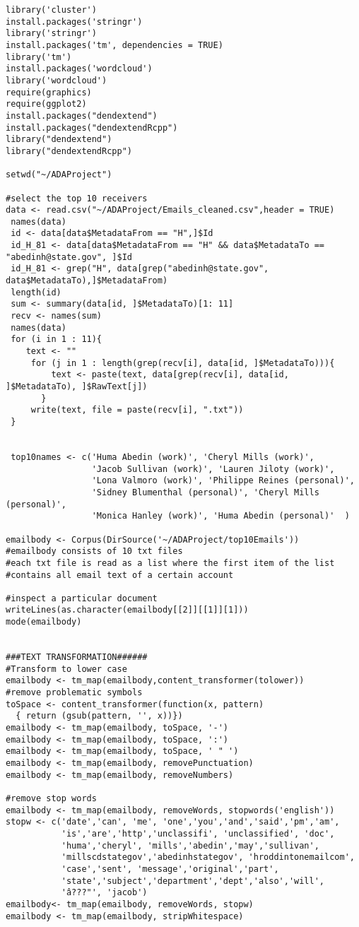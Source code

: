 \begin{verbatim}
library('cluster')
install.packages('stringr')
library('stringr')
install.packages('tm', dependencies = TRUE)
library('tm')
install.packages('wordcloud')
library('wordcloud')
require(graphics)
require(ggplot2)
install.packages("dendextend")
install.packages("dendextendRcpp")
library("dendextend")
library("dendextendRcpp")

setwd("~/ADAProject")

#select the top 10 receivers
data <- read.csv("~/ADAProject/Emails_cleaned.csv",header = TRUE)
 names(data)
 id <- data[data$MetadataFrom == "H",]$Id
 id_H_81 <- data[data$MetadataFrom == "H" && data$MetadataTo == "abedinh@state.gov", ]$Id
 id_H_81 <- grep("H", data[grep("abedinh@state.gov", data$MetadataTo),]$MetadataFrom)
 length(id)
 sum <- summary(data[id, ]$MetadataTo)[1: 11]
 recv <- names(sum)
 names(data)
 for (i in 1 : 11){
    text <- ""
     for (j in 1 : length(grep(recv[i], data[id, ]$MetadataTo))){
         text <- paste(text, data[grep(recv[i], data[id, ]$MetadataTo), ]$RawText[j])
       }
     write(text, file = paste(recv[i], ".txt"))
 }

 
 top10names <- c('Huma Abedin (work)', 'Cheryl Mills (work)', 
                 'Jacob Sullivan (work)', 'Lauren Jiloty (work)', 
                 'Lona Valmoro (work)', 'Philippe Reines (personal)', 
                 'Sidney Blumenthal (personal)', 'Cheryl Mills (personal)', 
                 'Monica Hanley (work)', 'Huma Abedin (personal)'  )

emailbody <- Corpus(DirSource('~/ADAProject/top10Emails'))
#emailbody consists of 10 txt files 
#each txt file is read as a list where the first item of the list
#contains all email text of a certain account

#inspect a particular document
writeLines(as.character(emailbody[[2]][[1]][1]))
mode(emailbody)


###TEXT TRANSFORMATION######
#Transform to lower case
emailbody <- tm_map(emailbody,content_transformer(tolower))
#remove problematic symbols
toSpace <- content_transformer(function(x, pattern) 
  { return (gsub(pattern, '', x))})
emailbody <- tm_map(emailbody, toSpace, '-')
emailbody <- tm_map(emailbody, toSpace, ':')
emailbody <- tm_map(emailbody, toSpace, ' " ')
emailbody <- tm_map(emailbody, removePunctuation)
emailbody <- tm_map(emailbody, removeNumbers)

#remove stop words
emailbody <- tm_map(emailbody, removeWords, stopwords('english'))
stopw <- c('date','can', 'me', 'one','you','and','said','pm','am',
           'is','are','http','unclassifi', 'unclassified', 'doc',
           'huma','cheryl', 'mills','abedin','may','sullivan',
           'millscdstategov','abedinhstategov', 'hroddintonemailcom',
           'case','sent', 'message','original','part',
           'state','subject','department','dept','also','will',
           'â???"', 'jacob')
emailbody<- tm_map(emailbody, removeWords, stopw)  
emailbody <- tm_map(emailbody, stripWhitespace)


\end{verbatim}
